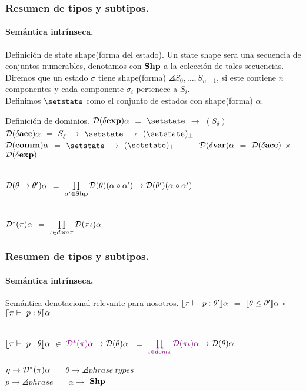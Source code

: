 \documentclass{beamer} %
\begin{document}
\begin{frame}
\frametitle{Resumen de tipos y subtipos.}
\framesubtitle{Sem\'antica intr\'inseca.}
\begin{block}{Definici\'on de state shape(forma del estado).}\small
Un state shape sera una secuencia de conjuntos numerables, denotamos con $\bf{Shp}$ a la colecci\'on de tales secuencias.\\
Diremos que un estado $\sigma$ tiene shape(forma) $\angles{S_0, \ldots, S_{n-1}}$, si este contiene $n$ componentes
y cada componente $\sigma_i$ pertenece a $S_i$.\\
Definimos $\setstate$ como el conjunto de estados con shape(forma) $\alpha$.
\end{block}
\begin{block}{Definici\'on de dominios.}\small
$\mathcal{D}(\delta \textbf{exp})\alpha$ $=$ $\setstate$ $\rightarrow$ $(S_\delta)_\bot$ \ \ \ \ \ \ \ \ 
$\mathcal{D}(\delta \textbf{acc})\alpha$ $=$ $S_\delta$ $\rightarrow$ $\setstate$ $\rightarrow$ $(\setstate)_\bot$\\
$\mathcal{D}(\textbf{comm})\alpha$ $=$ $\setstate$ $\rightarrow$ $(\setstate)_\bot$ \ \ \ \ \ 
$\mathcal{D}(\delta \textbf{var})\alpha$ $=$ $\mathcal{D}(\delta \textbf{acc})$ $\times$ $\mathcal{D}(\delta \textbf{exp})$ \\
\

$\mathcal{D}(\theta \rightarrow \theta')\alpha$ $=$ 
$\prod\limits_{\alpha' \in \bf{Shp}} \mathcal{D}(\theta)(\alpha \circ \alpha') \rightarrow \mathcal{D}(\theta')(\alpha \circ \alpha')$ \\
\

$\mathcal{D}^* (\pi)\alpha$ $=$ $\prod\limits_{\iota \in dom \pi} \mathcal{D}(\pi\iota)\alpha$
\end{block}
\end{frame}

\begin{frame}
\frametitle{Resumen de tipos y subtipos.}
\framesubtitle{Sem\'antica intr\'inseca.}
\begin{block}{Sem\'antica denotacional relevante para nosotros.}\small
$\llbracket \pi \vdash \ p:\theta' \rrbracket \alpha$ $=$ $\llbracket \theta \leq \theta' \rrbracket\alpha$ $\circ$ $\llbracket \pi \vdash \ p:\theta \rrbracket \alpha$\\
\

$\llbracket \pi \vdash \ p:\theta \rrbracket \alpha$ $\in$ $\textcolor{violet}{\mathcal{D}^{*}(\pi)\alpha} \rightarrow \mathcal{D}(\theta)\alpha$ $\ =$ 
$\textcolor{violet}{\prod\limits_{\iota \in dom \pi} \mathcal{D}(\pi\iota)\alpha} \rightarrow \mathcal{D}(\theta)\alpha$\\

\begin{center}
$\eta \rightarrow \mathcal{D}^{*}(\pi)\alpha$ \ \ \
$\theta \rightarrow \angles{phrase \ types}$\\

$p \rightarrow \angles{phrase}$ \ \ \
$\alpha \rightarrow$ ${\bf Shp}$\\
\end{center}
\end{block}
\end{frame}
\end{document}
